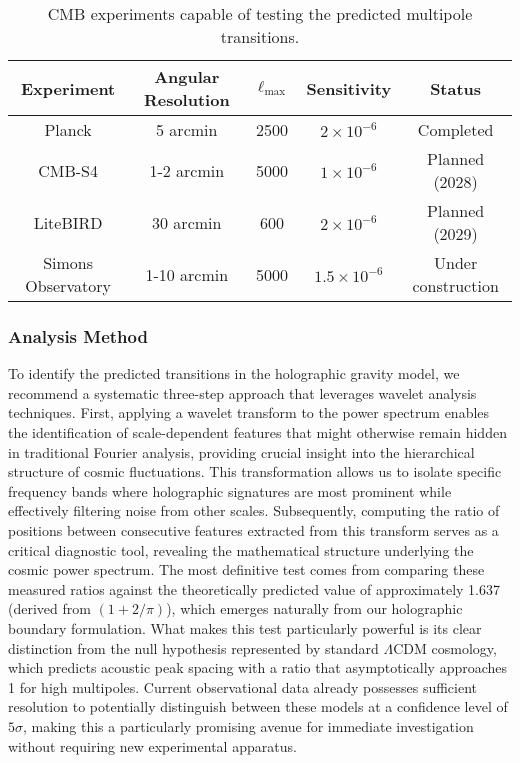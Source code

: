 \documentclass[11pt,english,twoside]{article}
\begin{document}
\begin{table}[ht]
\centering
\begin{tabular}{|c|c|c|c|c|}
\hline
\textbf{Experiment} & \textbf{Angular Resolution} & \textbf{$\ell_{\text{max}}$} & \textbf{Sensitivity} & \textbf{Status} \\
\hline
Planck & 5 arcmin & 2500 & $2 \times 10^{-6}$ & Completed \\
CMB-S4 & 1-2 arcmin & 5000 & $1 \times 10^{-6}$ & Planned (2028) \\
LiteBIRD & 30 arcmin & 600 & $2 \times 10^{-6}$ & Planned (2029) \\
Simons Observatory & 1-10 arcmin & 5000 & $1.5 \times 10^{-6}$ & Under construction \\
\hline
\end{tabular}
\caption{CMB experiments capable of testing the predicted multipole transitions.}
\label{tab:cmb_experiments}
\end{table}

\subsubsection{Analysis Method}

To identify the predicted transitions in the holographic gravity model, we recommend a systematic three-step approach that leverages wavelet analysis techniques. First, applying a wavelet transform to the power spectrum enables the identification of scale-dependent features that might otherwise remain hidden in traditional Fourier analysis, providing crucial insight into the hierarchical structure of cosmic fluctuations. This transformation allows us to isolate specific frequency bands where holographic signatures are most prominent while effectively filtering noise from other scales. Subsequently, computing the ratio of positions between consecutive features extracted from this transform serves as a critical diagnostic tool, revealing the mathematical structure underlying the cosmic power spectrum. The most definitive test comes from comparing these measured ratios against the theoretically predicted value of approximately 1.637 (derived from $(1 + 2/\pi)$), which emerges naturally from our holographic boundary formulation. What makes this test particularly powerful is its clear distinction from the null hypothesis represented by standard $\Lambda$CDM cosmology, which predicts acoustic peak spacing with a ratio that asymptotically approaches 1 for high multipoles. Current observational data already possesses sufficient resolution to potentially distinguish between these models at a confidence level of $5\sigma$, making this a particularly promising avenue for immediate investigation without requiring new experimental apparatus.
\end{document}
